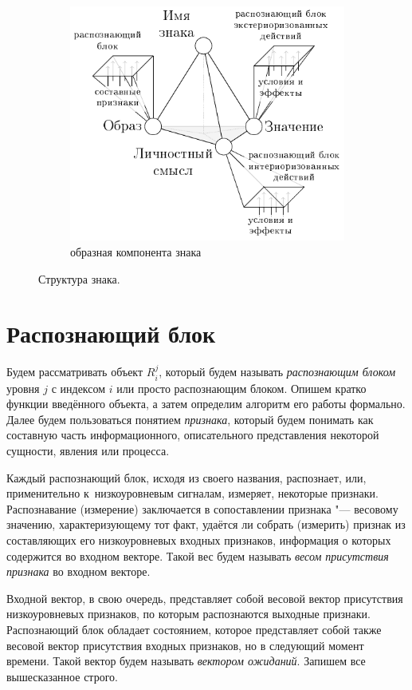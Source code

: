 \documentclass[a4paper, 12pt]{article}
\theoremstyle{plain}
\begin{document}
\begin{figure}
\begin{subfigure}[b]{0.5\textwidth}
			\includegraphics[width=\linewidth]{sign_rb}
			\caption{образная компонента знака}
			\label{fig:sign_rb}
		\end{subfigure}		
		\caption{Структура знака.}
	\end{figure}
		
	\section{Распознающий блок}
	Будем рассматривать объект $R_i^j$, который будем называть \textit{распознающим блоком} уровня $j$ с индексом $i$ или просто распознающим блоком. Опишем кратко функции введённого объекта, а затем определим алгоритм его работы формально.  Далее будем пользоваться понятием \textit{признака}, который будем понимать как составную часть информационного, описательного представления некоторой сущности, явления или процесса.
	
	Каждый распознающий блок, исходя из своего названия, распознает, или, применительно к~низкоуровневым сигналам, измеряет, некоторые признаки.  Распознавание (измерение) заключается в сопоставлении признака "--- весовому значению, характеризующему тот факт, удаётся ли собрать (измерить) признак из составляющих его низкоуровневых входных признаков, информация о которых содержится во входном векторе. Такой вес будем называть \textit{весом присутствия признака} во входном векторе.
	
	Входной вектор, в свою очередь, представляет собой весовой вектор присутствия низкоуровневых признаков, по которым распознаются выходные признаки. Распознающий блок обладает состоянием, которое представляет собой также весовой вектор присутствия входных признаков, но в следующий момент времени. Такой вектор будем называть \textit{вектором ожиданий}. Запишем все вышесказанное строго.
	
\end{document}
